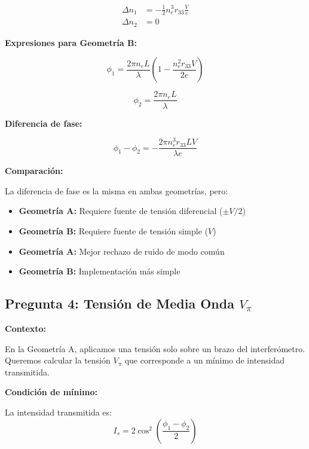 \documentclass[12pt,a4paper]{article}
\begin{document}
\begin{enumerate}
\begin{align}
    \Delta n_1 &= -\frac{1}{2} n_e^3 r_{33} \frac{V}{e} \\
    \Delta n_2 &= 0
\end{align}

\textbf{Expresiones para Geometría B:}

\begin{equation}
    \boxed{\phi_1 = \frac{2\pi n_e L}{\lambda} \left(1 - \frac{n_e^2 r_{33} V}{2e}\right)}
\end{equation}

\begin{equation}
    \boxed{\phi_2 = \frac{2\pi n_e L}{\lambda}}
\end{equation}

\textbf{Diferencia de fase:}

\begin{equation}
    \phi_1 - \phi_2 = -\frac{2\pi n_e^3 r_{33} L V}{\lambda e}
\end{equation}

\textbf{Comparación:}

La diferencia de fase es la misma en ambas geometrías, pero:
\begin{itemize}
    \item \textbf{Geometría A:} Requiere fuente de tensión diferencial ($\pm V/2$)
    \item \textbf{Geometría B:} Requiere fuente de tensión simple ($V$)
    \item \textbf{Geometría A:} Mejor rechazo de ruido de modo común
    \item \textbf{Geometría B:} Implementación más simple
\end{itemize}

\subsection{Pregunta 4: Tensión de Media Onda $V_\pi$}

\textbf{Contexto:}

En la Geometría A, aplicamos una tensión solo sobre un brazo del interferómetro. Queremos calcular la tensión $V_\pi$ que corresponde a un mínimo de intensidad transmitida.

\textbf{Condición de mínimo:}

La intensidad transmitida es:
\begin{equation}
    I_s = 2\cos^2\left(\frac{\phi_1 - \phi_2}{2}\right)
\end{equation}


\end{enumerate}
\end{document}

